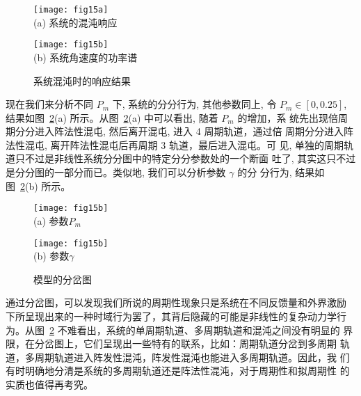 \documentclass[withoutpreface,bwprint]{cumcmthesis} %
\begin{document}
\begin{figure}[h!t]
\begin{minipage}{0.48\linewidth}
  \centering
  {
  \texttt{[image: fig15a]}\\
  (a) 系统的混沌响应
  }
\end{minipage}\hfill
\begin{minipage}{0.48\linewidth}
  \centering
  {
  \texttt{[image: fig15b]}\\
  (b) 系统角速度的功率谱
  }
\end{minipage}
    \caption{系统混沌时的响应结果}
    \label{fig15}
\end{figure}

现在我们来分析不同  $P_{m} $ 下, 系统的分分行为, 其他参数同上, 令 $ P_{m} \in[0,0.25] $, 结果如图~\ref{fig16}(a)  所示。从图~\ref{fig16}(a)  中可以看出, 随着 $ P_{m}$  的增加，系 统先出现倍周期分分进入阵法性混屯, 然后离开混屯, 进入 4 周期轨道，通过倍 周期分分进入阵法性混屯, 离开阵法性混屯后再周期 3 轨道，最后进入混屯。可 见, 单独的周期轨道只不过是非线性系统分分图中的特定分分参数处的一个断面 吐了, 其实这只不过是分分图的一部分而已。类似地, 我们可以分析参数 $ \gamma $ 的分 分行为, 结果如图~\ref{fig16}(b)  所示。

\begin{figure}[h!t]
\begin{minipage}{0.48\linewidth}
  \centering
  {
  \texttt{[image: fig15b]}\\
  (a) 参数$P_m$
  }
\end{minipage}\hfill
\begin{minipage}{0.48\linewidth}
  \centering
  {
  \texttt{[image: fig15b]}\\
  (b) 参数$\gamma$
  }
\end{minipage}
    \caption{模型的分岔图}
    \label{fig16}
\end{figure}

通过分岔图，可以发现我们所说的周期性现象只是系统在不同反馈量和外界激励
下所呈现出来的一种时域行为罢了，其背后隐藏的可能是非线性的复杂动力学行
为。从图~\ref{fig16} 不难看出，系统的单周期轨道、多周期轨道和混沌之间没有明显的
界限，在分岔图上，它们呈现出一些特有的联系，比如：周期轨道分岔到多周期
轨道，多周期轨道进入阵发性混沌，阵发性混沌也能进入多周期轨道。因此，我
们有时明确地分清是系统的多周期轨道还是阵法性混沌，对于周期性和拟周期性
的实质也值得再考究。
\end{document}
